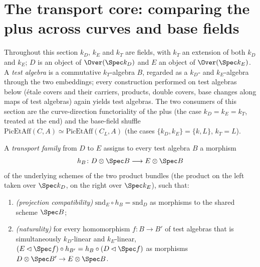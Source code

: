 \section{The transport core: comparing the plus across curves and base fields}

Throughout this section \(k_D\), \(k_E\) and \(k_T\) are fields, with \(k_T\) an extension
of both \(k_D\) and \(k_E\); \(D\) is an object of \(\Over(\Spec k_D)\) and \(E\) an object
of \(\Over(\Spec k_E)\). A \emph{test algebra} is a commutative \(k_T\)-algebra \(B\),
regarded as a \(k_D\)- and \(k_E\)-algebra through the two embeddings; every construction
performed on test algebras below (\'etale covers and their carriers, products, double
covers, base changes along maps of test algebras) again yields test algebras. The two
consumers of this section are the curve-direction functoriality of the plus (the case
\(k_D = k_E = k_T\), treated at the end) and the base-field shuffle
\(\mathrm{PicEtAff}(C, A) \simeq \mathrm{PicEtAff}(C_L, A)\) (the cases
\(\{k_D, k_E\} = \{k, L\}\), \(k_T = L\)).

\begin{definition}
  \label{pa-def:relPicTransportFamily}
  \leanok

  A \emph{transport family} from \(D\) to \(E\) assigns to every test algebra \(B\) a
  morphism
  \[
    h_B \colon D \otimes \Spec B \longrightarrow E \otimes \Spec B
  \]
  of the underlying schemes of the two product bundles (the product on the left taken over
  \(\Spec k_D\), on the right over \(\Spec k_E\)), such that:
  \begin{enumerate}
  \item \emph{(projection compatibility)} \(\mathrm{snd}_E \circ h_B = \mathrm{snd}_D\) as
    morphisms to the shared scheme \(\Spec B\);
  \item \emph{(naturality)} for every homomorphism \(f \colon B \to B'\) of test algebras
    that is simultaneously \(k_D\)-linear and \(k_E\)-linear,
    \((E \lhd \Spec f) \circ h_{B'} = h_B \circ (D \lhd \Spec f)\) as morphisms
    \(D \otimes \Spec B' \to E \otimes \Spec B\).
  \end{enumerate}
\end{definition}

